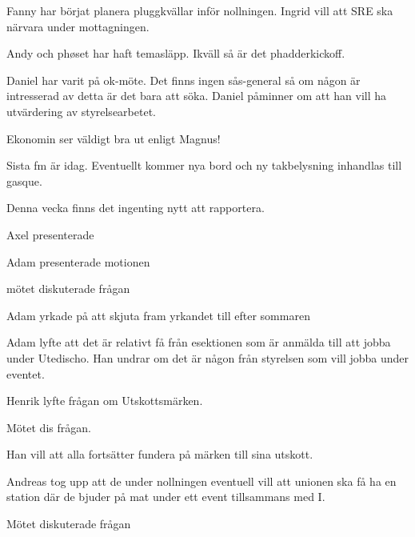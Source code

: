 \documentclass[10pt]{article}
\begin{document}
\begin{paragrafer}
\begin{paragrafer}
        Fanny har börjat planera pluggkvällar inför nollningen. Ingrid vill att SRE ska närvara under mottagningen.
    
        Andy och phøset har haft temasläpp. Ikväll så är det phadderkickoff.
    
        Daniel har varit på ok-möte. Det finns ingen sås-general så om någon är intresserad av detta är det bara att söka. Daniel påminner om att han vill ha utvärdering av styrelsearbetet.
    
        Ekonomin ser väldigt bra ut enligt Magnus!
 
 
        Sista fm är idag. Eventuellt kommer nya bord och ny takbelysning inhandlas till gasque. 

 
        Denna vecka finns det ingenting nytt att rapportera.
  

    \end{paragrafer}

        Axel presenterade 

        \Mbaby
    

        Adam presenterade motionen

        mötet diskuterade frågan

        Adam yrkade på att skjuta fram yrkandet till efter sommaren


        Adam lyfte att det är relativt få från esektionen som är anmälda till att jobba under Utedischo. Han undrar om det är någon från styrelsen som vill jobba under eventet.
    

        Henrik lyfte frågan om Utskottsmärken.

        Mötet dis frågan.

        Han vill att alla fortsätter fundera på märken till sina utskott. 


        Andreas tog upp att de under nollningen eventuell vill att unionen ska få ha en station där de bjuder på mat under ett event tillsammans med I.

        Mötet diskuterade frågan 


\end{paragrafer}
\end{document}
